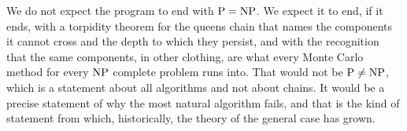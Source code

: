 We do not expect the program to end with $\mathrm{P} = \mathrm{NP}$. We expect it to end, if it ends, with a torpidity theorem for the queens chain that names the components it cannot cross and the depth to which they persist, and with the recognition that the same components, in other clothing, are what every Monte Carlo method for every $\mathrm{NP}$ complete problem runs into. That would not be $\mathrm{P} \neq \mathrm{NP}$, which is a statement about all algorithms and not about chains. It would be a precise statement of why the most natural algorithm fails, and that is the kind of statement from which, historically, the theory of the general case has grown.
